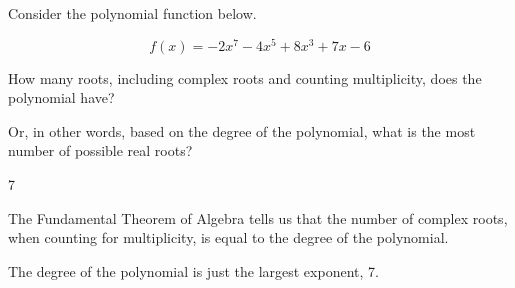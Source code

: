 
\begin{question}
Consider the polynomial function below.

\[f(x)=- 2 x^{7} - 4 x^{5} + 8 x^{3} + 7 x - 6\]

How many roots, including complex roots and counting multiplicity, does
the polynomial have?

Or, in other words, based on the degree of the polynomial, what is the
most number of possible real roots?
\end{question}

\begin{solution}
7

The Fundamental Theorem of Algebra tells us that the number of complex
roots, when counting for multiplicity, is equal to the degree of the
polynomial.

The degree of the polynomial is just the largest exponent, 7.
\end{solution}

